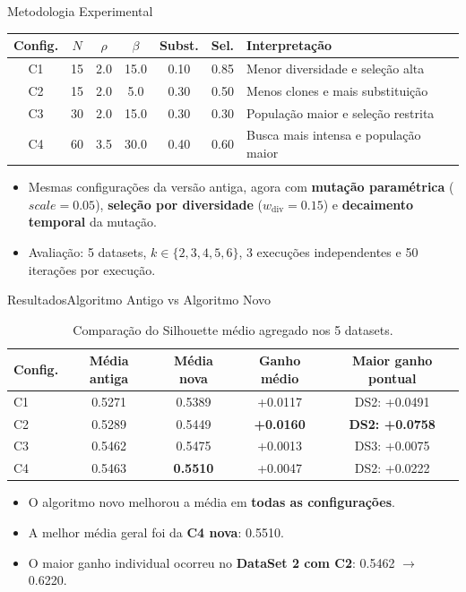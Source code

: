 \documentclass[aspectratio=169, 11pt]{beamer}
\begin{document}
\begin{frame}{Metodologia Experimental}
  \begin{table}
    \centering
    \scriptsize
    \begin{tabular}{ccccccp{4.0cm}}
      \toprule
      Config. & $N$ & $\rho$ & $\beta$ & Subst. & Sel. & Interpretação \\
      \midrule
      C1 & 15 & 2.0 & 15.0 & 0.10 & 0.85 & Menor diversidade e seleção alta \\
      C2 & 15 & 2.0 & 5.0 & 0.30 & 0.50 & Menos clones e mais substituição \\
      C3 & 30 & 2.0 & 15.0 & 0.30 & 0.30 & População maior e seleção restrita \\
      C4 & 60 & 3.5 & 30.0 & 0.40 & 0.60 & Busca mais intensa e população maior \\
      \bottomrule
    \end{tabular}
  \end{table}
  \vspace{0.2cm}
  \begin{itemize}
    \item Mesmas configurações da versão antiga, agora com \textbf{mutação paramétrica} ($scale=0.05$), \textbf{seleção por diversidade} ($w_{\text{div}}=0.15$) e \textbf{decaimento temporal} da mutação.
    \item Avaliação: 5 datasets, $k \in \{2,3,4,5,6\}$, 3 execuções independentes e 50 iterações por execução.
  \end{itemize}
\end{frame}

\begin{frame}{Resultados}{Algoritmo Antigo vs Algoritmo Novo}
  \begin{table}
    \centering
    \small
    \begin{tabular}{lcccc}
      \toprule
      Config. & Média antiga & Média nova & Ganho médio & Maior ganho pontual \\
      \midrule
      C1 & 0.5271 & 0.5389 & +0.0117 & DS2: +0.0491 \\
      C2 & 0.5289 & 0.5449 & \textbf{+0.0160} & \textbf{DS2: +0.0758} \\
      C3 & 0.5462 & 0.5475 & +0.0013 & DS3: +0.0075 \\
      C4 & 0.5463 & \textbf{0.5510} & +0.0047 & DS2: +0.0222 \\
      \bottomrule
    \end{tabular}
    \caption{Comparação do Silhouette médio agregado nos 5 datasets.}
  \end{table}
  \begin{itemize}
    \item O algoritmo novo melhorou a média em \textbf{todas as configurações}.
    \item A melhor média geral foi da \textbf{C4 nova}: 0.5510.
    \item O maior ganho individual ocorreu no \textbf{DataSet 2 com C2}: 0.5462 $\rightarrow$ 0.6220.
  \end{itemize}
\end{frame}
\end{document}
